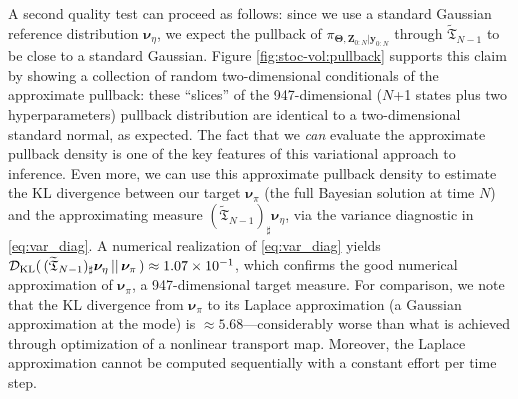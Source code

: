 \documentclass[twoside,11pt]{article}
\newcommand{\push}{_\sharp}                                      %
\newcommand{\genm}{\boldsymbol{\nu} }   %
\newcommand{\yb}{\boldsymbol{y}}
\newcommand{\Zb}{\boldsymbol{Z}}
\newcommand{\vhyp}{\boldsymbol{\Theta}}
\newcommand{\Dkl}{\mathcal{D}_{\rm KL}}         %
\begin{document}
A second {quality} test can proceed as follows:
since we use a standard Gaussian reference distribution $\genm_{\eta}$, we expect the
pullback of $\pi_{\vhyp,\Zb_{0:N} \vert \yb_{0:N}}$ through 
$\widetilde{ \mathfrak{T} }_{N-1}$ to be close to a standard Gaussian.
Figure \ref{fig:stoc-vol:pullback}  %
supports this claim by showing a collection of random two-dimensional conditionals
of the approximate pullback: these ``slices'' of the 947-dimensional 
($N$+1 states plus two hyperparameters)
pullback distribution are identical to a two-dimensional
standard normal, as expected.
The fact that we {\it can}  evaluate the approximate pullback density is one of
the key features of this variational approach to inference.
Even more, we can use this approximate pullback density 
to estimate the KL divergence between our target $\genm_{\pi}$ 
(the full Bayesian solution at time $N$) 
and the approximating measure 
$(\widetilde{ \mathfrak{T} }_{N-1})\push \genm_{\eta}$, via the
variance diagnostic in \eqref{eq:var_diag}.
%
A numerical realization of \eqref{eq:var_diag} 
yields $\Dkl(\,(\widetilde{ \mathfrak{T} }_{N-1})\push 
\genm_{\eta} \,\vert\vert \, \genm_{\pi} \, ) \approx 1.07 \times 10^{-1}$, which
confirms the good numerical 
approximation of $\genm_\pi$, a 947-dimensional target measure.
For comparison, we note that the KL divergence from
$\genm_\pi$ to its 
Laplace 
approximation (a Gaussian approximation at the mode) is %
$\approx 5.68$---considerably
worse 
%
%
%
%
%
than what is achieved through optimization of
a nonlinear transport map.
Moreover, the Laplace approximation {cannot} be computed
sequentially with a constant effort per time step.
\end{document}
